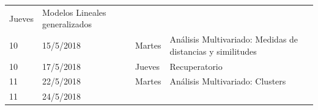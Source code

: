 \documentclass[]{book}
\theoremstyle{definition}
\theoremstyle{definition}
\theoremstyle{definition}
\theoremstyle{remark}
\begin{document}
\begin{longtable}[]{@{}llll@{}}
\begin{minipage}[t]{0.05\columnwidth}
Jueves\strut
\end{minipage} & \begin{minipage}[t]{0.71\columnwidth}\raggedright
Modelos Lineales generalizados\strut
\end{minipage}\tabularnewline
\begin{minipage}[t]{0.05\columnwidth}\raggedright
10\strut
\end{minipage} & \begin{minipage}[t]{0.07\columnwidth}\raggedright
15/5/2018\strut
\end{minipage} & \begin{minipage}[t]{0.05\columnwidth}\raggedright
Martes\strut
\end{minipage} & \begin{minipage}[t]{0.71\columnwidth}\raggedright
Análisis Multivariado: Medidas de distancias y similitudes\strut
\end{minipage}\tabularnewline
\begin{minipage}[t]{0.05\columnwidth}\raggedright
10\strut
\end{minipage} & \begin{minipage}[t]{0.07\columnwidth}\raggedright
17/5/2018\strut
\end{minipage} & \begin{minipage}[t]{0.05\columnwidth}\raggedright
Jueves\strut
\end{minipage} & \begin{minipage}[t]{0.71\columnwidth}\raggedright
Recuperatorio\strut
\end{minipage}\tabularnewline
\begin{minipage}[t]{0.05\columnwidth}\raggedright
11\strut
\end{minipage} & \begin{minipage}[t]{0.07\columnwidth}\raggedright
22/5/2018\strut
\end{minipage} & \begin{minipage}[t]{0.05\columnwidth}\raggedright
Martes\strut
\end{minipage} & \begin{minipage}[t]{0.71\columnwidth}\raggedright
Análisis Multivariado: Clusters\strut
\end{minipage}\tabularnewline
\begin{minipage}[t]{0.05\columnwidth}\raggedright
11\strut
\end{minipage} & \begin{minipage}[t]{0.07\columnwidth}\raggedright
24/5/2018\strut
\end{minipage} & \begin{minipage}[t]{0.05\columnwidth}\raggedright

\end{minipage}
\end{longtable}
\end{document}
